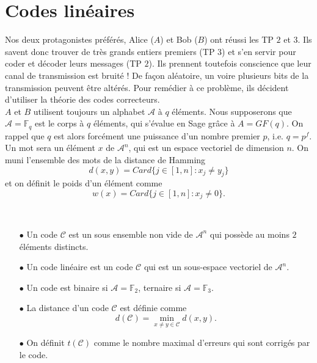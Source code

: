 \section{Codes linéaires}


Nos deux protagonistes préférés, Alice ($A$) et Bob ($B$) ont réussi les TP $2$ et $3$. Ils savent donc trouver de très grands entiers premiers (TP $3$) et s'en servir pour coder et décoder leurs messages (TP $2$). Ils prennent toutefois conscience que leur canal de transmission est bruité ! De façon aléatoire, un voire plusieurs bits de la transmission peuvent être altérés. Pour remédier à ce problème, ils décident d'utiliser la théorie des codes correcteurs.\\

$A$ et $B$ utilisent toujours un alphabet $\mathcal A$ à $q$ éléments. Nous supposerons que $\mathcal A = \mathbb F_q $ est le corps à $q$ éléments, qui s'évalue en Sage grâce à $A=GF(q)$. On rappel que $q$ est alors forcément une puissance d'un nombre premier $p$, i.e. $q=p^f$. Un mot sera un élément $x$ de $\mathcal A^n$, qui est un espace vectoriel de dimension $n$. On muni l'ensemble des mots de la distance de Hamming
\[d(x,y)=Card \{j\in [1,n] : x_j\neq y_j\}\]
et on définit le poids d'un élément comme
\[w(x)=Card \{j\in [1,n] : x_j\neq 0\}.\]
\begin{definition}\
\begin{itemize}
\item[$\bullet$] Un code $\mathcal C$ est un sous ensemble non vide de $\mathcal A^n$ qui possède au moins $2$ éléments distincts.
\item[$\bullet$] Un code linéaire est un code $\mathcal C$ qui est un sous-espace vectoriel de $\mathcal A ^n$.
\item[$\bullet$] Un code est binaire si $\mathcal A=\mathbb F_2$, ternaire si $\mathcal A = \mathbb F_3$.
\item[$\bullet$] La distance d'un code $\mathcal C$ est définie comme \[d(\mathcal C)=\min_{x\neq y \in \mathcal C} d(x,y).\]
\item[$\bullet$] On définit $t(\mathcal C)$ comme le nombre maximal d'erreurs qui sont corrigés par le code.
\end{itemize}
\end{definition}

